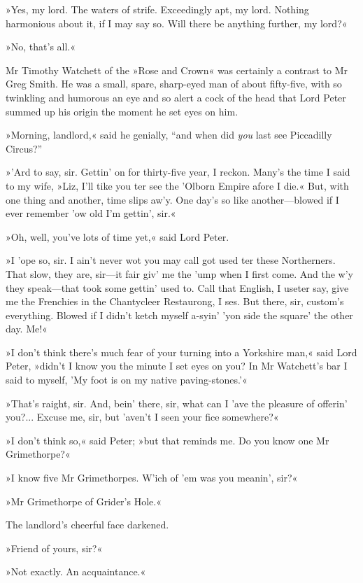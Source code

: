 »Yes, my lord. The waters of strife. Exceedingly apt, my lord. Nothing harmonious about it, if I may say so. Will there be anything further, my lord?«

»No, that's all.«

Mr Timothy Watchett of the »Rose and Crown« was certainly a contrast to Mr Greg Smith. He was a small, spare, sharp-eyed man of about fifty-five, with so twinkling and humorous an eye and so alert a cock of the head that Lord Peter summed up his origin the moment he set eyes on him.

»Morning, landlord,« said he genially, \enquote{and when did \textit{you} last see Piccadilly Circus?}

»'Ard to say, sir. Gettin' on for thirty-five year, I reckon. Many's the time I said to my wife, »Liz, I'll tike you ter see the 'Olborn Empire afore I die.« But, with one thing and another, time slips aw'y. One day's so like another\allowbreak---\allowbreak blowed if I ever remember 'ow old I'm gettin', sir.«

»Oh, well, you've lots of time yet,« said Lord Peter.

»I 'ope so, sir. I ain't never wot you may call got used ter these Northerners. That slow, they are, sir\allowbreak---\allowbreak it fair giv' me the 'ump when I first come. And the w'y they speak\allowbreak---\allowbreak that took some gettin' used to. Call that English, I useter say, give me the Frenchies in the Chantycleer Restaurong, I ses. But there, sir, custom's everything. Blowed if I didn't ketch myself a-syin' 'yon side the square' the other day. Me!«

»I don't think there's much fear of your turning into a Yorkshire man,« said Lord Peter, »didn't I know you the minute I set eyes on you? In Mr Watchett's bar I said to myself, 'My foot is on my native paving-stones.'«

»That's raight, sir. And, bein' there, sir, what can I 'ave the pleasure of offerin' you?... Excuse me, sir, but 'aven't I seen your fice somewhere?«

»I don't think so,« said Peter; »but that reminds me. Do you know one Mr Grimethorpe?«

»I know five Mr Grimethorpes. W'ich of 'em was you meanin', sir?«

»Mr Grimethorpe of Grider's Hole.«

The landlord's cheerful face darkened.

»Friend of yours, sir?«

»Not exactly. An acquaintance.«

